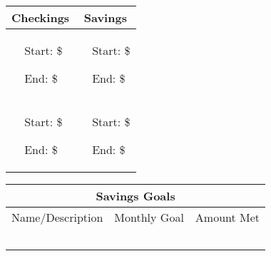 \documentclass{article}
\newcommand{\bw}{80mm}
\newcommand{\lw}{30mm}
\newcommand{\accountrow}{
				\vspace{4pt}
				\begin{center}
								\large Start: \$\underline{\hspace{\lw}}
				\end{center} %
				\begin{center}
								\large End: \hspace{0.5pt} \$\underline{\hspace{\lw}}
				\end{center}	
				\vspace{2pt}
}
\begin{document}
\begin{center} 
  \begin{tabular}{ | m{30mm} | m{\bw} | m{30mm} | m{\bw} | }
	  \hline 
		\multicolumn{2}{|c|}{\huge Checkings} & 
		\multicolumn{2}{c|}{\huge Savings} \\
		\hline
		\LARGE \centering{ Kristen } & 
	  \vspace{4pt}
		\accountrow &
		\LARGE \centering{ Kristen } & 
		\accountrow \\
		\hline 
		\LARGE \centering{ Jerome } & 
		\accountrow & 
		\LARGE \centering{ Jerome } & 
		\accountrow \\
		\hline
	\end{tabular}
\end{center}

\begin{center}
	\begin{tabular}{ | m{125mm} | m{50mm} | m{50mm} | }
		\hline
    \multicolumn{3}{|c|}{\huge Savings Goals} \\
		\hline
		\LARGE Name/Description & \LARGE Monthly Goal & \LARGE Amount Met
		\\ \hline
								& & \\
								\hline 
								& & \\
								\hline 
								& & \\
								\hline 
								& & \\
								\hline
								& & \\
								\hline 
  \end{tabular}
\end{center}
\end{document}

